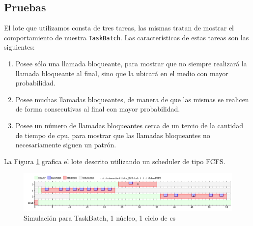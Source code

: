 \subsection{Pruebas}

El lote que utilizamos consta de tres tareas, las mismas tratan de mostrar el comportamiento de nuestra {\tt TaskBatch}.  Las características de estas tareas son las siguientes:

\begin{enumerate}
\item Posee sólo una llamada bloqueante, para mostrar que no siempre realizará la llamada bloqueante al final, sino que la ubicará en el medio con mayor probabilidad.
\item Posee muchas llamadas bloqueantes, de manera de que las mismas se realicen de forma consecutivas al final con mayor probabilidad.
\item Posee un número de llamadas bloqueantes cerca de un tercio de la cantidad de tiempo de cpu, para mostrar que las llamadas bloqueantes no necesariamente siguen un patrón.
\end{enumerate}

La Figura \ref{fig-batch} grafica el lote descrito utilizando un scheduler de tipo FCFS.

\begin{figure}[!htb]
\begin{center}
  \includegraphics[scale=0.45]{imagenes/ej3.png}
\end{center}
\caption{Simulación para TaskBatch, 1 núcleo, 1 ciclo de cs}\label{fig-batch}
\end{figure}
